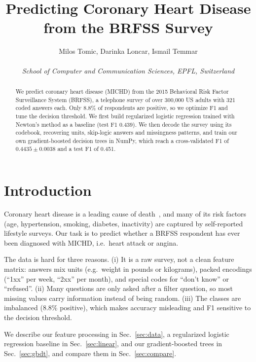 \documentclass[10pt,conference,compsocconf]{IEEEtran}
\begin{document}
\title{Predicting Coronary Heart Disease from the BRFSS Survey}

\author{
  Milos Tomic, Darinka Loncar, Ismail Temmar\\  \\
  \textit{School of Computer and Communication Sciences, EPFL, Switzerland}
}

\maketitle

\begin{abstract}
We predict coronary heart disease (MICHD) from the 2015 Behavioral Risk Factor
Surveillance System (BRFSS), a telephone survey of over 300{,}000 US adults with
321 coded answers each. Only 8.8\% of respondents are positive, so we optimize
F1 and tune the decision threshold. We first build regularized logistic
regression trained with Newton's method as a baseline (test F1 0.439). We then
decode the survey using its codebook, recovering units, skip-logic answers and
missingness patterns, and train our own gradient-boosted decision trees in
NumPy, which reach a cross-validated F1 of $0.4435 \pm 0.0038$ and a test F1 of
0.451.
\end{abstract}

\section{Introduction}

Coronary heart disease is a leading cause of death~\cite{cdcHeartDisease}, and many of its risk
factors (age, hypertension, smoking, diabetes, inactivity) are captured by
self-reported lifestyle surveys. Our task is to predict whether a BRFSS
respondent has ever been diagnosed with MICHD, i.e.\ heart attack or angina.

The data is hard for three reasons. (i) It is a raw survey, not a clean
feature matrix: answers mix units (e.g.\ weight in pounds or kilograms),
packed encodings (``1xx'' per week, ``2xx'' per month), and special codes for
``don't know'' or ``refused''. (ii) Many questions are only asked after a
filter question, so most missing values carry information instead of being
random. (iii) The classes are imbalanced (8.8\% positive), which makes
accuracy misleading and F1 sensitive to the decision threshold.

We describe our feature processing in Sec.~\ref{sec:data}, a regularized
logistic regression baseline in Sec.~\ref{sec:linear}, and our gradient-boosted
trees in Sec.~\ref{sec:gbdt}, and compare them in Sec.~\ref{sec:compare}.
\end{document}
